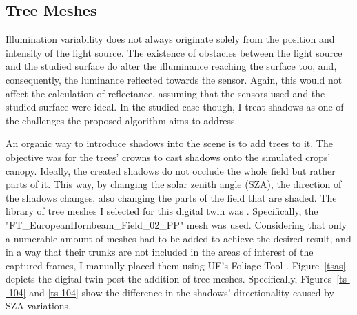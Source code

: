 \subsection{Tree Meshes}

Illumination variability does not always originate solely from the position and intensity of the light source. The existence of obstacles between the light source and the studied surface do alter the illuminance reaching the surface too, and, consequently, the luminance reflected towards the sensor. Again, this would not affect the calculation of reflectance, assuming that the sensors used and the studied surface were ideal. In the studied case though, I treat shadows as one of the challenges the proposed algorithm aims to address.

An organic way to introduce shadows into the scene is to add trees to it. The objective was for the trees' crowns to cast shadows onto the simulated crops' canopy. Ideally, the created shadows do not occlude the whole field but rather parts of it. This way, by changing the solar zenith angle (SZA), the direction of the shadows changes, also changing the parts of the field that are shaded. The library of tree meshes I selected for this digital twin was \cite{european_hornbeam}. Specifically, the "FT\_EuropeanHornbeam\_Field\_02\_PP" mesh was used. Considering that only a numerable amount of meshes had to be added to achieve the desired result, and in a way that their trunks are not included in the areas of interest of the captured frames, I manually placed them using UE's Foliage Tool \cite{epicgames_foliagetool}. Figure~\ref{tsas} depicts the digital twin post the addition of tree meshes. Specifically, Figures~\ref{ts--104} and \ref{ts-104} show the difference in the shadows' directionality caused by SZA variations.


